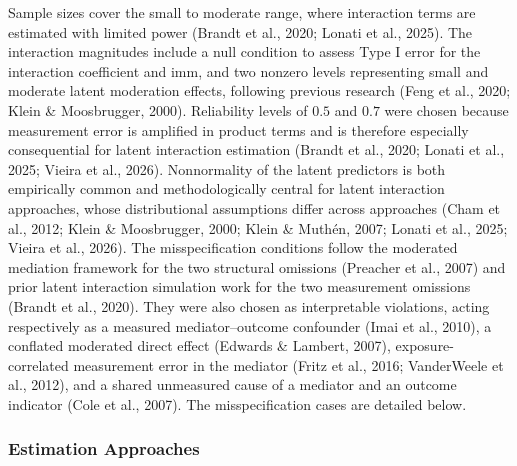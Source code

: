 \documentclass[
  man,
  longtable,
  nolmodern,
  notxfonts,
  notimes,
  colorlinks=true,linkcolor=blue,citecolor=blue,urlcolor=blue]{apa7}
\begin{document}
Sample sizes cover the small to moderate range, where interaction terms
are estimated with limited power (Brandt et al., 2020; Lonati et al.,
2025). The interaction magnitudes include a null condition to assess
Type I error for the interaction coefficient and imm, and two nonzero
levels representing small and moderate latent moderation effects,
following previous research (Feng et al., 2020; Klein \& Moosbrugger,
2000). Reliability levels of \(0.5\) and \(0.7\) were chosen because
measurement error is amplified in product terms and is therefore
especially consequential for latent interaction estimation (Brandt et
al., 2020; Lonati et al., 2025; Vieira et al., 2026). Nonnormality of
the latent predictors is both empirically common and methodologically
central for latent interaction approaches, whose distributional
assumptions differ across approaches (Cham et al., 2012; Klein \&
Moosbrugger, 2000; Klein \& Muthén, 2007; Lonati et al., 2025; Vieira et
al., 2026). The misspecification conditions follow the moderated
mediation framework for the two structural omissions (Preacher et al.,
2007) and prior latent interaction simulation work for the two
measurement omissions (Brandt et al., 2020). They were also chosen as
interpretable violations, acting respectively as a measured
mediator--outcome confounder (Imai et al., 2010), a conflated moderated
direct effect (Edwards \& Lambert, 2007), exposure-correlated
measurement error in the mediator (Fritz et al., 2016; VanderWeele et
al., 2012), and a shared unmeasured cause of a mediator and an outcome
indicator (Cole et al., 2007). The misspecification cases are detailed
below.

\subsubsection{Estimation Approaches}\label{estimation-approaches}
\end{document}
